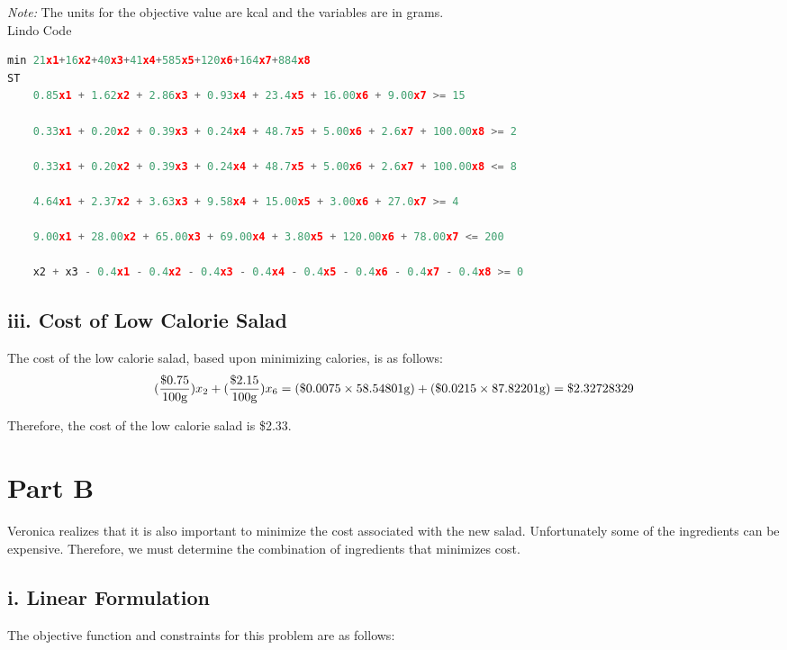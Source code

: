 \documentclass[11pt]{scrreprt}
\begin{document}
{\it Note:} The units for the objective value are kcal and the variables are in grams.\\

Lindo Code
\begin{lstlisting}[basicstyle=\small,language=c]
min 21x1+16x2+40x3+41x4+585x5+120x6+164x7+884x8
ST
	0.85x1 + 1.62x2 + 2.86x3 + 0.93x4 + 23.4x5 + 16.00x6 + 9.00x7 >= 15
	
	0.33x1 + 0.20x2 + 0.39x3 + 0.24x4 + 48.7x5 + 5.00x6 + 2.6x7 + 100.00x8 >= 2
	
	0.33x1 + 0.20x2 + 0.39x3 + 0.24x4 + 48.7x5 + 5.00x6 + 2.6x7 + 100.00x8 <= 8	
	
	4.64x1 + 2.37x2 + 3.63x3 + 9.58x4 + 15.00x5 + 3.00x6 + 27.0x7 >= 4
	
	9.00x1 + 28.00x2 + 65.00x3 + 69.00x4 + 3.80x5 + 120.00x6 + 78.00x7 <= 200
	
	x2 + x3 - 0.4x1 - 0.4x2 - 0.4x3 - 0.4x4 - 0.4x5 - 0.4x6 - 0.4x7 - 0.4x8 >= 0
\end{lstlisting}

\subsection{iii. Cost of Low Calorie Salad}
The cost of the low calorie salad, based upon minimizing calories, is as follows:\\

\begin{displaymath}
({\$0.75 \over 100\text{g}})x_2 + ({\$2.15 \over 100\text{g}})x_6 = (\$0.0075 \times 58.54801\text{g}) + (\$0.0215 \times 87.82201\text{g}) = \$2.32728329
\end{displaymath}

Therefore, the cost of the low calorie salad is \$2.33.

\section{Part B}
Veronica realizes that it is also important to minimize the cost associated with the new salad. Unfortunately some of the ingredients can be expensive. Therefore, we must determine the combination of ingredients that minimizes cost.

\subsection{i. Linear Formulation}
The objective function and constraints for this problem are as 
follows:
\end{document}
